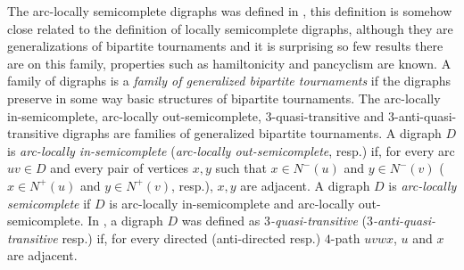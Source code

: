%
The  arc-locally semicomplete digraphs was defined in \cite{bang2004structure}, this definition is somehow close related to the definition of locally semicomplete digraphs, although they are generalizations of bipartite tournaments and it is surprising so few results there are on this family, properties such as hamiltonicity and pancyclism are known.
%
A family of digraphs is a \emph{family of generalized bipartite tournaments} if the digraphs preserve in some way basic structures of bipartite tournaments.
The arc-locally in-semicomplete, arc-locally out-semicomplete, $3$-quasi-transitive and $3$-anti-quasi-transitive digraphs are families of generalized bipartite tournaments.
A digraph $D$ is \emph{arc-locally in-semicomplete} (\emph{arc-locally out-semicomplete}, resp.) if, for every arc $uv\in D$ and every pair of vertices $x,y$ such that $x\in N^-(u)$ and $y\in N^-(v)$ ($x\in N^+(u)$ and $y\in N^+(v)$, resp.),  $x,y$ are adjacent. A digraph $D$ is \emph{arc-locally semicomplete} if $D$ is arc-locally in-semicomplete and arc-locally out-semicomplete.
In \cite{bang2004structure}, a digraph $D$ was defined as \emph{$3$-quasi-transitive} (\emph{$3$-anti-quasi-transitive} resp.) if, for every directed (anti-directed resp.) $4$-path $uvwx$, $u$ and $x$ are adjacent.

